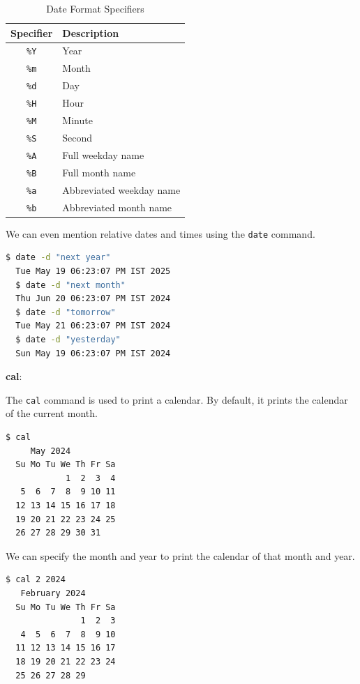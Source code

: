 \begin{table}[h]
\caption{Date Format Specifiers}
\begin{tabular}{ c l }
  \toprule
 Specifier & Description \\
 \midrule
  \texttt{\%Y} & Year \\
  \texttt{\%m} & Month \\
  \texttt{\%d} & Day \\
  \texttt{\%H} & Hour \\
  \texttt{\%M} & Minute \\
  \texttt{\%S} & Second \\
  \texttt{\%A} & Full weekday name \\
  \texttt{\%B} & Full month name \\
  \texttt{\%a} & Abbreviated weekday name \\
  \texttt{\%b} & Abbreviated month name \\
  \bottomrule
\end{tabular}
\end{table}

We can even mention relative dates and times using the \texttt{date} command.

\begin{lstlisting}[language=bash]
  $ date -d "next year"
  Tue May 19 06:23:07 PM IST 2025
  $ date -d "next month"
  Thu Jun 20 06:23:07 PM IST 2024
  $ date -d "tomorrow"
  Tue May 21 06:23:07 PM IST 2024
  $ date -d "yesterday"
  Sun May 19 06:23:07 PM IST 2024
\end{lstlisting}

\textbf{cal}:

The \texttt{cal} command is used to print a calendar.
By default, it prints the calendar of the current month.

\begin{lstlisting}[language=bash]
  $ cal
     May 2024
  Su Mo Tu We Th Fr Sa
            1  2  3  4
   5  6  7  8  9 10 11
  12 13 14 15 16 17 18
  19 20 21 22 23 24 25
  26 27 28 29 30 31
\end{lstlisting}

We can specify the month and year to print the calendar of that month and year.

\begin{lstlisting}[language=bash]
  $ cal 2 2024
   February 2024
  Su Mo Tu We Th Fr Sa
               1  2  3
   4  5  6  7  8  9 10
  11 12 13 14 15 16 17
  18 19 20 21 22 23 24
  25 26 27 28 29
\end{lstlisting}

